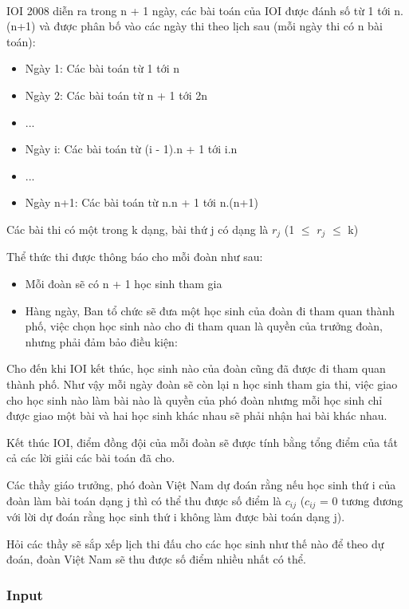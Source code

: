 

 

IOI 2008 diễn ra trong n + 1 ngày, các bài toán của IOI được đánh số từ 1 tới n.(n+1) và được phân bố vào các ngày thi theo lịch sau (mỗi ngày thi có n bài toán):
\begin{itemize}
	\item Ngày 1: Các bài toán từ 1 tới n
	\item Ngày 2: Các bài toán từ n + 1 tới 2n
	\item ...
	\item Ngày i: Các bài toán từ (i - 1).n + 1 tới i.n
	\item ...
	\item Ngày n+1: Các bài toán từ n.n + 1 tới n.(n+1)
\end{itemize}

Các bài thi có một trong k dạng, bài thứ j có dạng là $r_{j}$ (1  $\le$  $r_{j}$  $\le$  k)

Thể thức thi được thông báo cho mỗi đoàn như sau:
\begin{itemize}
	\item Mỗi đoàn sẽ có n + 1 học sinh tham gia
	\item Hàng ngày, Ban tổ chức sẽ đưa một học sinh của đoàn đi tham quan thành phố, việc chọn học sinh nào cho đi tham quan là quyền của trưởng đoàn, nhưng phải đảm bảo điều kiện:
\end{itemize}

Cho đến khi IOI kết thúc, học sinh nào của đoàn cũng đã được đi tham quan thành phố. Như vậy mỗi ngày đoàn sẽ còn lại n học sinh tham gia thi, việc giao cho học sinh nào làm bài nào là quyền của phó đoàn nhưng mỗi học sinh chỉ được giao một bài và hai học sinh khác nhau sẽ phải nhận hai bài khác nhau.

Kết thúc IOI, điểm đồng đội của mỗi đoàn sẽ được tính bằng tổng điểm của tất cả các lời giải các bài toán đã cho.

Các thầy giáo trưởng, phó đoàn Việt Nam dự đoán rằng nếu học sinh thứ i của đoàn làm bài toán dạng j thì có thể thu được số điểm là $c_{ij}$ ($c_{ij}$ = 0 tương đương với lời dự đoán rằng học sinh thứ i không làm được bài toán dạng j).

Hỏi các thầy sẽ sắp xếp lịch thi đấu cho các học sinh như thế nào để theo dự đoán, đoàn Việt Nam sẽ thu được số điểm nhiều nhất có thể.

\subsubsection{Input}

